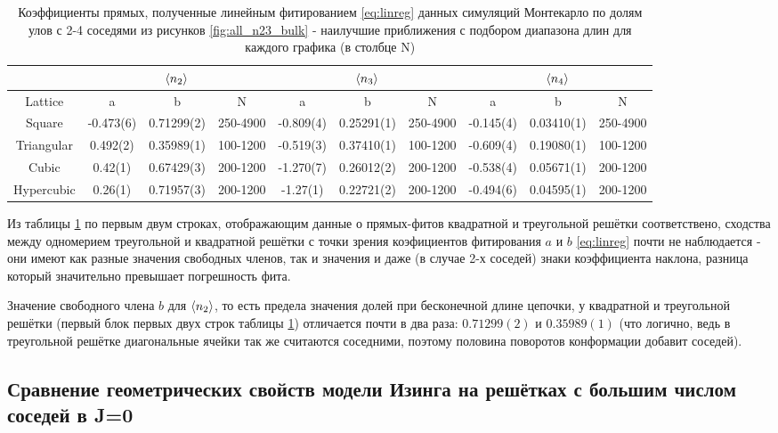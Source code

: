 \begin{table}[h]
    \centering
    \begin{tabular}{|c|c|c|c|c|c|c|c|c|c|} \hline
         & \multicolumn{3}{|c|}{$\langle n_{2} \rangle$} & \multicolumn{3}{|c|}{$\langle n_{3} \rangle$} & \multicolumn{3}{|c|}{$\langle n_{4} \rangle$}\\ \hline
         Lattice & a & b & N & a & b & N & a & b & N \\ \hline
        Square & -0.473(6) & 0.71299(2) & 250-4900 & -0.809(4) & 0.25291(1) & 250-4900 & -0.145(4) & 0.03410(1) & 250-4900  \\ \hline
        Triangular & 0.492(2) & 0.35989(1) & 100-1200 & -0.519(3) & 0.37410(1) & 100-1200 & -0.609(4) & 0.19080(1) & 100-1200 \\ \hline
        Cubic & 0.42(1) & 0.67429(3) & 200-1200 & -1.270(7) & 0.26012(2) & 200-1200 & -0.538(4) & 0.05671(1) & 200-1200 \\ \hline
        Hypercubic & 0.26(1) & 0.71957(3) & 200-1200 & -1.27(1) & 0.22721(2) & 200-1200 & -0.494(6) & 0.04595(1) & 200-1200\\ \hline
    \end{tabular}
    \caption{Коэффициенты прямых, полученные линейным фитированием \eqref{eq:linreg} данных симуляций Монтекарло по долям улов с 2-4 соседями из рисунков \ref{fig:all_n23_bulk} - наилучшие приближения с подбором диапазона длин для каждого графика (в столбце N)}
    \label{tab:n24_fit_coeff}
\end{table}

Из таблицы \ref{tab:n24_fit_coeff} по первым двум строках, отображающим данные о прямых-фитов квадратной и треугольной решётки соответствено, сходства между одномерием треугольной и квадратной решётки с точки зрения коэфициентов фитирования $a$ и $b$ \eqref{eq:linreg} почти не наблюдается - они имеют как разные значения свободных членов, так и значения и даже (в случае 2-х соседей) знаки коэффициента наклона, разница который значительно превышает погрешность фита. 

Значение свободного члена $b$ для $\langle n_{2} \rangle$, то есть предела значения долей при бесконечной длине цепочки, у квадратной и треугольной решётки (первый блок первых двух строк таблицы \ref{tab:n24_fit_coeff}) отличается почти в два раза: $0.71299(2)$ и $0.35989(1)$ (что логично, ведь в треугольной решётке диагональные ячейки так же считаются соседними, поэтому половина поворотов конформации добавит соседей).



\subsection{Сравнение геометрических свойств модели Изинга на решётках с большим числом соседей в J=0}

